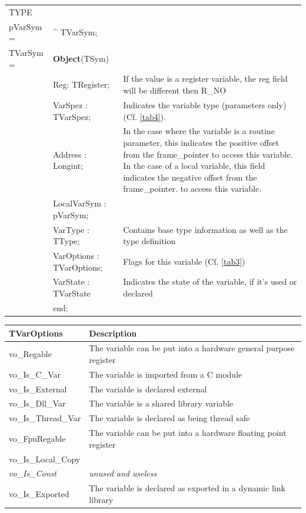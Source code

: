 \documentclass [a4paper,12pt]{article}
\begin{document}
\begin{tabular*}{6.5in}{|l@{\extracolsep{\fill}}lp{8.5cm}|}
\hline
\textsf{TYPE}& & \\
\xspace pVarSym = & \^{}  TVarSym; & \\
\xspace \textsf{TVarSym} = & \textbf{Object}(TSym) & \\
& \textsf{Reg: TRegister;}&
	If the value is a register variable, the \textsf{reg} field will be
	different then R{\_}NO \\
& \textsf{VarSpez : TVarSpez;}&
	Indicates the variable type (parameters only) (Cf. \ref{tab4}). \\
& \textsf{Address : Longint;}&
	In the case where the variable is a routine parameter, this
	indicates the positive offset from the \textsf{frame{\_}pointer }to
	access this variable. In the case of a local variable, this field
	indicates the negative offset from the \textsf{frame{\_}pointer}. to
	access this variable. \\
& \textsf{LocalVarSym : pVarSym;}&  \\
& \textsf{VarType : TType;}&
	Contains base type information as well as the type definition \\
& \textsf{VarOptions : TVarOptions;}&
	Flags for this variable (Cf. \ref{tab3}) \\
& \textsf{VarState : TVarState}&
	Indicates the state of the variable, if it's used or declared \\
& \textsf{end;}&  \\
\hline
\end{tabular*}

\begin{longtable}{|l|p{10cm}|}
\hline
TVarOptions & Description \\
\hline
\endhead
\hline
\endfoot
\textsf{vo{\_}Regable}&
	The variable can be put into a hardware general purpose register \\
\textsf{vo{\_}Is{\_}C{\_}Var}&
	The variable is imported from a C module \\
\textsf{vo{\_}Is{\_}External}&
	The variable is declared external \\
\textsf{vo{\_}Is{\_}Dll{\_}Var}&
	The variable is a shared library variable \\
\textsf{vo{\_}Is{\_}Thread{\_}Var}&
	The variable is declared as being thread safe \\
\textsf{vo{\_}FpuRegable}&
	The variable can be put into a hardware floating point register \\
\textsf{vo{\_}Is{\_}Local{\_}Copy}&  \\
\textsf{\textit{vo{\_}Is{\_}Const}}&
	\textit{unused and useless} \\
\textsf{vo{\_}Is{\_}Exported}&
	The variable is declared as exported in a dynamic link library 
\end{longtable}
\end{document}

